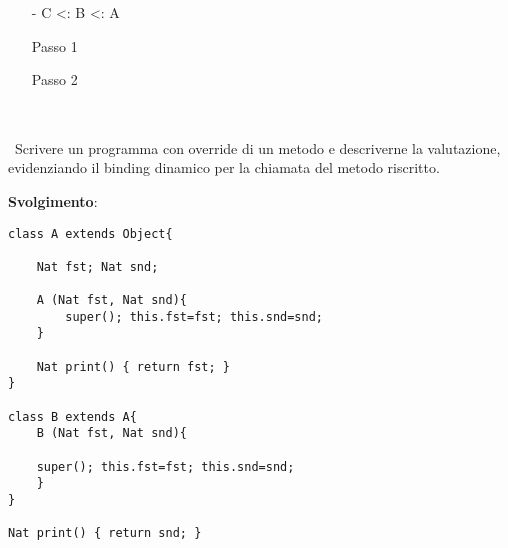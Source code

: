 \begin{itemize}
\begin{itemize}
\begin{prooftree}
	\end{prooftree}	
\vspace{1,5cm}

	\item[-] C <: B <: A
	
	Passo 1
\vspace{0,5cm}
	\begin{prooftree}
	\end{prooftree}				
\vspace{1cm}

Passo 2
\vspace{0,3cm}
	\begin{prooftree}
	\end{prooftree}	
		\end{itemize}
\end{itemize}

\vspace{1cm}
\subsection*{}\
\\
\
Scrivere un programma con override di un metodo e descriverne la valutazione, evidenziando il binding dinamico
per la chiamata del metodo riscritto.

\vspace{0,5cm}
\textbf{Svolgimento}:

\begin{lstlisting}
class A extends Object{ 

	Nat fst; Nat snd;
 
	A (Nat fst, Nat snd){ 
		super(); this.fst=fst; this.snd=snd; 
	}

	Nat print() { return fst; } 
}

class B extends A{  
	B (Nat fst, Nat snd){ 

	super(); this.fst=fst; this.snd=snd; 
	}
} 

Nat print() { return snd; }
 

\end{lstlisting}    

